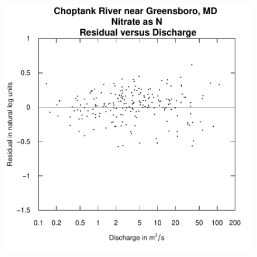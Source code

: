\documentclass[a4paper,11pt]{article}
\begin{document}
\begin{figure}[htbp]
  \begin{minipage}[h]{0.5\linewidth}
    \begin{center}

\includegraphics{EGRET-figplotResidQ}
    \label{fig:plotResidQ}
    \end{center}
  \end{minipage}
  \hspace{0.5cm}
  \begin{minipage}[h]{0.5\linewidth}
    \begin{center}



\end{center}
\end{minipage}
\end{figure}
\end{document}
